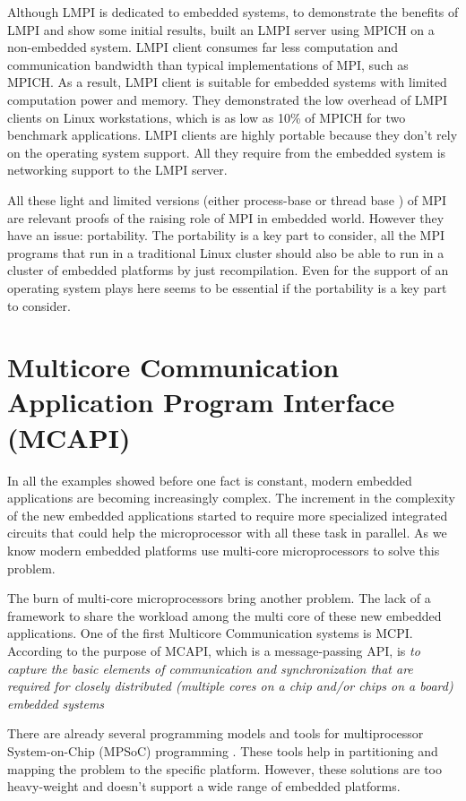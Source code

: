 Although LMPI is dedicated to embedded systems, to demonstrate the benefits of
LMPI and show some initial results, \cite{Abgaria} built an LMPI server using
MPICH on a non-embedded system. LMPI client consumes far less computation and
communication bandwidth than typical implementations of MPI, such as MPICH.  As
a result, LMPI client is suitable for embedded systems with limited computation
power and memory. They demonstrated the low overhead of LMPI clients on Linux
workstations, which is as low as 10\% of MPICH for two benchmark applications.
LMPI clients are highly portable because they don't rely on the operating
system support. All they require from the embedded system is networking support
to the LMPI server.

All these light and limited versions (either process-base or thread base ) of
MPI are relevant proofs of the raising role of MPI in embedded world. However
they have an issue: portability. The portability is a key part to consider, all
the MPI programs that run in a traditional Linux cluster should also be able to
run in a cluster of embedded platforms  by just recompilation.  Even for
\cite{Gallego} the support of an operating system plays here seems to be
essential if the portability is a key part to consider.

\section{Multicore Communication Application Program Interface (MCAPI)}

In all the examples showed before one fact is constant, modern embedded
applications are becoming increasingly complex. The increment in the complexity
of the new embedded applications started to require more specialized integrated
circuits that could help the microprocessor with all these task in parallel. As
we know modern embedded platforms use multi-core microprocessors to solve this
problem.

The burn of multi-core microprocessors bring another problem. The lack of a
framework to share the workload among the multi core of these new embedded
applications. One of the first Multicore Communication systems is MCPI.
According to \cite{MCAPI} the purpose of MCAPI, which is a message-passing API,
is \textit{to capture the basic elements of communication and synchronization
that are required for closely distributed (multiple cores on a chip and/or
chips on a board) embedded systems} 

There are already several programming models and tools for multiprocessor
System-on-Chip (MPSoC) programming \cite{Wolf} \cite{Matilainen}. These tools help  in
partitioning and mapping the problem to the specific platform. However, these
solutions are too heavy-weight and doesn't support a wide range of embedded
platforms. 

